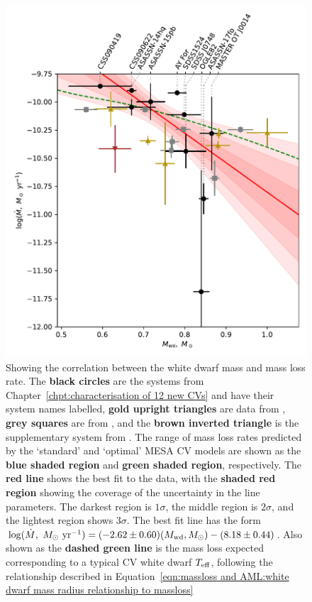 \begin{figure}
    \centering
    \includegraphics[width=\textwidth]{figures/results/Mdot/Mwd_Mdot.pdf}
    \caption{Showing the correlation between the white dwarf mass and mass loss rate. The {\bf black circles} are the systems from Chapter~\ref{chpt:characterisation of 12 new CVs} and have their system names labelled, {\bf gold upright triangles} are data from \citet{McAllister2019}, {\bf grey squares} are from \citet{Savoury2011}, and the {\bf brown inverted triangle} is the supplementary system from \citet{mcallister2017b}. The range of mass loss rates predicted by the `standard' and `optimal' MESA CV models are shown as the {\bf blue shaded region} and {\bf green shaded region}, respectively. The {\bf red line} shows the best fit to the data, with the {\bf shaded red region} showing the coverage of the uncertainty in the line parameters. The darkest region is $1\sigma$, the middle region is $2\sigma$, and the lightest region shows $3\sigma$. The best fit line has the form $\log ( \dot M,\ M_\odot\ {\rm yr}^{-1}) = (-2.62 \pm 0.60) (M_{\rm wd}, M_\odot) - (8.18 \pm 0.44)$. Also shown as the {\bf dashed green line} is the mass loss expected corresponding to a typical CV white dwarf $T_{\rm eff}$, following the relationship described in Equation~\ref{eqn:massloss and AML:white dwarf mass radius relationship to massloss}}
    \label{fig:massloss and AML:white dwarf mass vs Mdot fit}
\end{figure}
